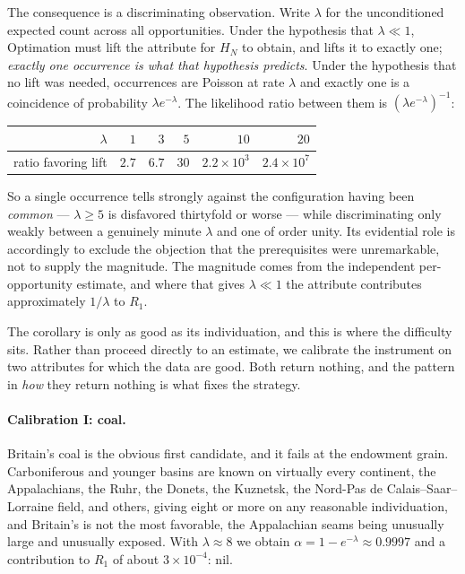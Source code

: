 The consequence is a discriminating observation. Write $\lambda$ for
the unconditioned expected count across all opportunities. Under the
hypothesis that $\lambda\ll1$, Optimation must lift the attribute for
$H_N$ to obtain, and lifts it to exactly one; \emph{exactly one
occurrence is what that hypothesis predicts}. Under the hypothesis that
no lift was needed, occurrences are Poisson at rate $\lambda$ and
exactly one is a coincidence of probability $\lambda e^{-\lambda}$. The
likelihood ratio between them is $\left(\lambda
e^{-\lambda}\right)^{-1}$:
\begin{center}\small
\begin{tabular}{@{}rrrrrr@{}}
\toprule
$\lambda$ & $1$ & $3$ & $5$ & $10$ & $20$\\
\midrule
ratio favoring lift & $2.7$ & $6.7$ & $30$ & $2.2\times10^{3}$ &
$2.4\times10^{7}$\\
\bottomrule
\end{tabular}
\end{center}
So a single occurrence tells strongly against the configuration having
been \emph{common} --- $\lambda\ge5$ is disfavored thirtyfold or worse
--- while discriminating only weakly between a genuinely minute
$\lambda$ and one of order unity. Its evidential role is accordingly to
exclude the objection that the prerequisites were unremarkable, not to
supply the magnitude. The magnitude comes from the independent
per-opportunity estimate, and where that gives $\lambda\ll1$ the
attribute contributes approximately $1/\lambda$ to $R_1$.

The corollary is only as good as its individuation, and this is where
the difficulty sits. Rather than proceed directly to an estimate, we
calibrate the instrument on two attributes for which the data are good.
Both return nothing, and the pattern in \emph{how} they return nothing
is what fixes the strategy.

\paragraph{Calibration I: coal.} Britain's coal is the obvious first
candidate, and it fails at the endowment grain. Carboniferous and
younger basins are known on virtually every continent, the
Appalachians, the Ruhr, the Donets, the Kuznetsk, the Nord-Pas de
Calais--Saar--Lorraine field, and others, giving eight or more on any
reasonable individuation, and Britain's is not the most favorable, the
Appalachian seams being unusually large and unusually exposed. With
$\lambda\approx8$ we obtain $\alpha=1-e^{-\lambda}\approx0.9997$ and a
contribution to $R_1$ of about $3\times10^{-4}$: nil.

